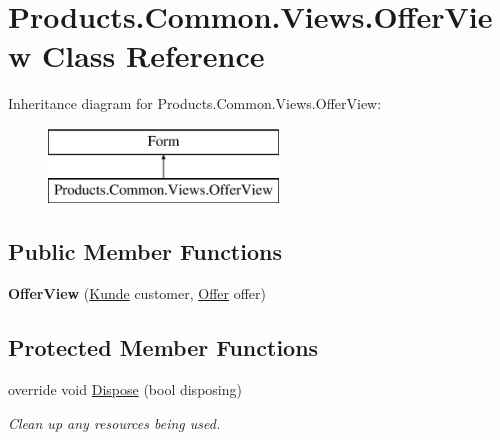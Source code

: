 \hypertarget{class_products_1_1_common_1_1_views_1_1_offer_view}{}\section{Products.\+Common.\+Views.\+Offer\+View Class Reference}
\label{class_products_1_1_common_1_1_views_1_1_offer_view}
Inheritance diagram for Products.\+Common.\+Views.\+Offer\+View\+:\begin{figure}[H]
\begin{center}
\leavevmode
\includegraphics[height=2.000000cm]{class_products_1_1_common_1_1_views_1_1_offer_view}
\end{center}
\end{figure}
\subsection*{Public Member Functions}
\begin{DoxyCompactItemize}
\item 
{\bfseries Offer\+View} (\hyperlink{class_products_1_1_model_1_1_entities_1_1_kunde}{Kunde} customer, \hyperlink{class_products_1_1_model_1_1_entities_1_1_offer}{Offer} offer)\hypertarget{class_products_1_1_common_1_1_views_1_1_offer_view_ab3224809b5d42f99abac08cbee2305b8}{}\label{class_products_1_1_common_1_1_views_1_1_offer_view_ab3224809b5d42f99abac08cbee2305b8}

\end{DoxyCompactItemize}
\subsection*{Protected Member Functions}
\begin{DoxyCompactItemize}
\item 
override void \hyperlink{class_products_1_1_common_1_1_views_1_1_offer_view_a57b89a36c6133751c5c5581373f36075}{Dispose} (bool disposing)
\begin{DoxyCompactList}\small\item\em Clean up any resources being used. \end{DoxyCompactList}\end{DoxyCompactItemize}


